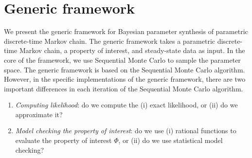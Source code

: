 \section{Generic framework}
We present the generic framework for Bayesian parameter synthesis of parametric discrete-time Markov
chain. The generic framework takes a parametric discrete-time Markov chain, a property of interest,
and steady-state data as input. In the core of the framework, we use Sequential Monte Carlo to
sample the parameter space. The generic framework is based on the Sequential Monte Carlo algorithm.
However, in the specific implementations of the generic framework, there are two important
differences in each iteration of the Sequential Monte Carlo algorithm.
\begin{enumerate}
    \item \textit{Computing likelihood}: do we compute the (i) exact likelihood, or (ii) do we
          approximate it?
    \item \textit{Model checking the property of interest}: do we use (i) rational functions to
          evaluate the property of interest $\Phi$, or (ii) do we use statistical model checking?
\end{enumerate}
